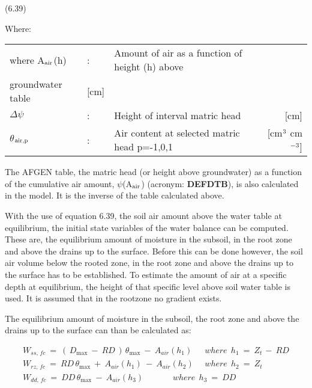  
\strut\hfill (6.39)

Where:\\
\begin{tabularx}{\textwidth}{llXr}



where A$_{{\rm air}}$(h) &:& Amount of air as a function of height (h) above\\
   groundwater table   & [cm]\\
$\Delta$$\psi$ &:& Height of interval matric head  & [cm]\\
$\theta$$_{{\rm air,p}}$ &:& Air content at selected matric head p=-1,0,1  & [cm$^{{\rm 3}}$ cm$^{{\rm -3}}$]
\end{tabularx}



The AFGEN table, the matric head (or height above groundwater) as a function of the
cumulative air amount, $\psi$(A$_{{\rm air}}$) (acronym: {\bf DEFDTB}), is also calculated in the model. It is
the inverse of the table calculated above.



With the use of equation 6.39, the soil air amount above the water table at equilibrium,
the initial state variables of the water balance can be computed. These are, the equilibri\-um amount of moisture in the subsoil, in the root zone and above the drains up to the
surface. Before this can be done however, the soil air volume below the rooted zone, in
the root zone and above the drains up to the surface has to be established. To estimate the
amount of air at a specific depth at equilibrium, the height of that specific level above soil
water table is used. It is assumed that in the rootzone no gradient exists. 











The equilibrium amount of moisture in the subsoil, the root zone and above the drains up
to the surface can than be calculated as:

\begin{eqnarray*}
 W _{ss,\, fc} ~=~ (\, D _{\max } ~-~ RD\, )\, \theta  _{\max } ~-~ A _{air} (h _{1} )~~\, ~~~~where~~h _{1} ~=~Z _{t~} -~RD  \nonumber  \\
W _{rz,\, fc} ~=~ RD\, \theta  _{\max } ~+~A _{air} (h _{1} )~-~A _{air} (h _{2} )~~~~~~where~~h _{2} ~=~Z _{t} \nonumber  \\
W _{dd,\, fc} ~=~ DD\, \theta  _{\max } ~-~A _{air} (h _{3} )~~\, ~~~~~~~~~~~~~where~~h _{3} ~=~DD
\end{eqnarray*}

